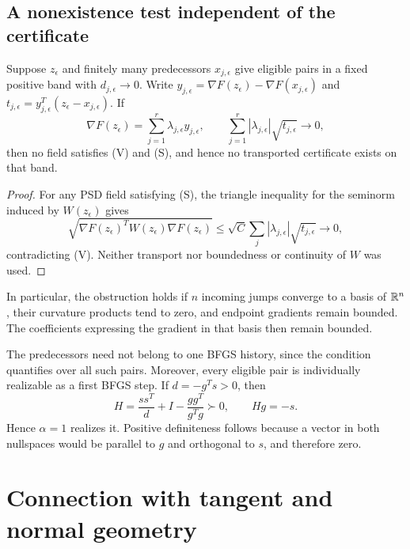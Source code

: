 

\subsection{A nonexistence test independent of the certificate}

\begin{proposition}\label{G:prop:star}
Suppose $z_\epsilon$ and finitely many predecessors $x_{j,\epsilon}$ give eligible pairs in a fixed positive band with $d_{j,\epsilon}\to0$. Write $y_{j,\epsilon}=\nabla F(z_\epsilon)-\nabla F(x_{j,\epsilon})$ and $t_{j,\epsilon}=y_{j,\epsilon}^T(z_\epsilon-x_{j,\epsilon})$. If
\[
 \nabla F(z_\epsilon)=\sum_{j=1}^r\lambda_{j,\epsilon}y_{j,\epsilon},
 \qquad
 \sum_{j=1}^r|\lambda_{j,\epsilon}|\sqrt{t_{j,\epsilon}}\longrightarrow0,
\]
then no field satisfies (V) and (S), and hence no transported certificate exists on that band.
\end{proposition}
\begin{proof}
For any PSD field satisfying (S), the triangle inequality for the seminorm induced by $W(z_\epsilon)$ gives
\[
 \sqrt{\nabla F(z_\epsilon)^TW(z_\epsilon)\nabla F(z_\epsilon)}
 \le\sqrt C\sum_j|\lambda_{j,\epsilon}|\sqrt{t_{j,\epsilon}}\to0,
\]
contradicting (V). Neither transport nor boundedness or continuity of $W$ was used.
\end{proof}
In particular, the obstruction holds if $n$ incoming jumps converge to a basis of $\mathbb R^n$, their curvature products tend to zero, and endpoint gradients remain bounded. The coefficients expressing the gradient in that basis then remain bounded.

The predecessors need not belong to one BFGS history, since the condition quantifies over all such pairs. Moreover, every eligible pair is individually realizable as a first BFGS step. If $d=-g^Ts>0$, then
\[
 H=\frac{ss^T}{d}+I-\frac{gg^T}{g^Tg}\succ0,\qquad Hg=-s.
\]
Hence $\alpha=1$ realizes it. Positive definiteness follows because a vector in both nullspaces would be parallel to $g$ and orthogonal to $s$, and therefore zero.


\setcounter{section}{3}
\setcounter{theorem}{0}
\setcounter{equation}{4}


\section{Connection with tangent and normal geometry}


